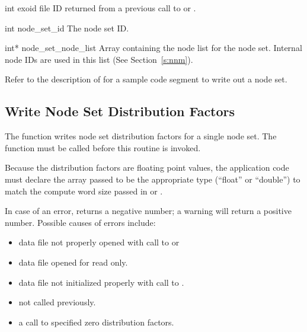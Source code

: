 
\begin{parameters}
\item[{int exoid \R{}}]
\exo{} file ID returned from a previous call to  
or .

\item[{int node_set_id \R{}}]
The node set ID.

\item[{int* node_set_node_list \R{}}]
Array containing the node list for the node set. Internal node IDs are
used in this list (See Section~\ref{s:nnm}).
\end{parameters}

Refer to the description of  for a
sample code segment to write out a node set.



\subsection{Write Node Set Distribution Factors}

The function  writes node set
distribution factors for a single node set. The function
 must be called before this routine
is invoked.


Because the distribution factors are floating point values, the
application code must declare the array passed to be the appropriate
type (``float'' or ``double'') to match the compute word size passed
in  or .


In case of an error,  returns a
negative number; a warning will return a positive number.  Possible
causes of errors include:

\begin{itemize}
 \item data file not properly opened with call to 
 or 

 \item data file opened for read only.

 \item data file not initialized properly with call to .

 \item {} not called previously.

 \item a call to  specified zero
 distribution factors.
\end{itemize}


